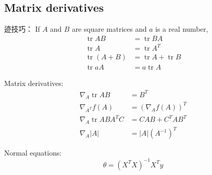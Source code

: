 \documentclass[UTF8]{ctexart}
\DeclareMathOperator{\tr}{tr}
\begin{document}
	\subsection{Matrix derivatives}
	迹技巧：
	If $A$ and $B$ are square matrices and $a$ is a real number,
	\begin{equation*}
	\begin{aligned}
	\tr AB&=\tr BA \\
	\tr A&=\tr A^T \\
	\tr (A+B)&=\tr A + \tr B \\
	\tr aA &= a\tr A 
	\end{aligned}	
	\end{equation*}
	
	Matrix derivatives:
	\begin{equation*}
	\begin{aligned}
	\nabla_A\tr AB & =B^T\\
	\nabla_{A^T}f(A) & =(\nabla_Af(A))^T\\
	\nabla_A\tr ABA^TC & =CAB+C^TAB^T\\
	\nabla_A{|A|}&=|A|(A^{-1})^T
	\end{aligned}	
	\end{equation*}
	
	Normal equations:
	\begin{equation*}
		\theta = (X^TX)^{-1}X^Ty
	\end{equation*}
	
\end{document}
